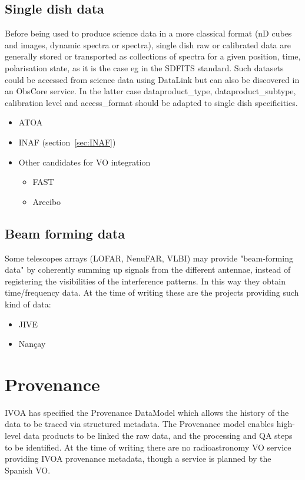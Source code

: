 \documentclass[11pt,a4paper]{ivoa}
\begin{document}
\subsection{Single dish data}
Before being used to produce science data in a more classical format (nD cubes and images, dynamic
spectra or spectra),  single dish  raw or calibrated data are generally stored or transported as 
collections of spectra for a given position, time, polarisation state, as it is the case eg in the 
SDFITS standard. Such datasets could be accessed from science data using DataLink but can also be 
discovered in an ObsCore service. In the latter case dataproduct\_type, dataproduct\_subtype, 
calibration level and access\_format should be adapted to single dish specificities.
\begin{itemize}
\item ATOA 
\item INAF (section~\ref{sec:INAF})
\item Other candidates for VO integration
\begin{itemize}
\item  FAST
\item Arecibo
\end{itemize}
\end{itemize}
\subsection{Beam forming data}
Some telescopes arrays (LOFAR, NenuFAR, VLBI) may provide "beam-forming data" by coherently summing up 
signals from the different antennae, instead of registering the visibilities of the interference 
patterns. In this way they obtain time/frequency data. At the time of writing these are the projects 
providing such kind of data:
\begin{itemize}
\item JIVE
\item Nan\c cay
\end{itemize}
\section{Provenance}

IVOA has specified the Provenance DataModel \citep{2020ivoa.spec.0411S} which allows the history of the 
data to be traced via structured metadata. The Provenance model enables high-level data products to be 
linked the raw data, and the processing and QA steps to be identified. At the time of writing there are 
no radioastronomy VO service providing IVOA provenance metadata, though a service is planned by the 
Spanish VO.   
\end{document}
